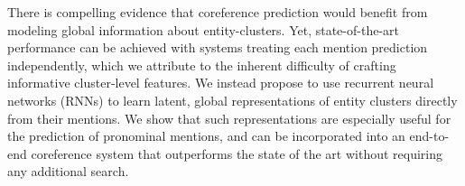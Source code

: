 There is compelling evidence that coreference prediction would benefit from modeling global information about entity-clusters. Yet, state-of-the-art performance can be achieved with systems treating each mention prediction independently, which we attribute to the inherent difficulty of crafting informative cluster-level features. We instead propose to use recurrent neural networks (RNNs) to learn latent, global representations of entity clusters directly from their mentions. We show that such representations are especially useful for the prediction of pronominal mentions, and can be incorporated into an end-to-end coreference system that outperforms the state of the art without requiring any additional search.
